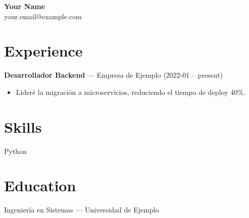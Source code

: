\documentclass[11pt]{article}
\begin{document}
\begin{center}
{\Large \textbf{Your Name}}\\
your.email@example.com
\end{center}

\section*{Experience}
\textbf{Desarrollador Backend} --- Empresa de Ejemplo (2022-01 -- present)
\begin{itemize}[nosep]
\item Lideré la migración a microservicios, reduciendo el tiempo de deploy 40\%.
\end{itemize}

\section*{Skills}
Python

\section*{Education}
Ingeniería en Sistemas --- Universidad de Ejemplo
\end{document}

